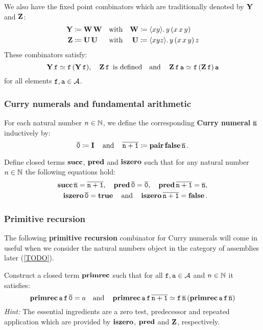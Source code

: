 We also have the fixed point combinators which are traditionally denoted by
\(\pcay\) and \(\pcaz\):
\begin{align*}
  \pcay &\coloneqq \pcaw\pcaw &\text{with}&& \pcaw &\coloneq \lambdapca{xy}{y\,(x\,x\,y)} \\
  \pcaz &\coloneqq \pcau\pcau &\text{with}&& \pcau &\coloneq \lambdapca{xyz}{y\,(x\,x\,y)\,z}
\end{align*}
These combinators satisfy:
\[
  \pcay\pca{f} \simeq \pca{f}{(\pcay\pca{f})},
    \quad
  \pcaz\pca{f} \text { is defined}
    \quad\text{and}\quad
  \pcaz\pca{f}\pca{a} \simeq \pca{f}{(\pcaz\pca{f})}\pca{a}
\]
for all elements \(\pca{f},\pca{a} \in \AA\).

\subsubsection*{Curry numerals and fundamental arithmetic}

For each natural number \(n \in \Nat\), we define the corresponding
\textbf{Curry numeral} \(\numeral{n}\) inductively by:
\[
  \numeral{0} \coloneq \icomb
  \quad\text{and}\quad
  \numeral{n+1} \coloneq \pcapair\pcafalse\numeral{n}.
\]

\begin{exercise}\label{exer:arithmetic}
  Define closed terms \(\pcasucc\), \(\pcapred\) and \(\pcaiszero\) such that
  for any natural number \(n \in \Nat\) the following equations hold:
  \begin{align*}
    \pcasucc\numeral{n} = \numeral{n+1},
    \quad
    \pcapred\numeral{0} = \numeral{0},
    \quad
    \pcapred\numeral{n+1} = \numeral{n}, \\
    \pcaiszero\numeral{0} = \pcatrue
    \quad\text{and}\quad
    \pcaiszero\numeral{n+1} = \pcafalse.
  \end{align*}

\end{exercise}

\subsubsection*{Primitive recursion}

The following \textbf{primitive recursion} combinator for Curry numerals will
come in useful when we consider the natural numbers object in the category of
assemblies later (\cref{TODO}).

\begin{exercise}\label{exer:primitive-recursion}
  Construct a closed term \(\pcarec\) such that for all
  \(\pca{f},\pca{a} \in \AA\) and \(n \in \Nat\) it satisfies:
  \[
    \pcarec\pca{a}\pca{f}\numeral{0} = a
    \quad\text{and}\quad
    \pcarec\pca{a}\pca{f}\numeral{n+1} \simeq \pca{f}\numeral{n}{(\pcarec\pca{a}\pca{f}\numeral{n})}
  \]
  \emph{Hint:} The essential ingredients are a zero test, predecessor and
  repeated application which are provided by \(\pcaiszero\), \(\pcapred\) and
  \(\pcaz\), respectively.
\end{exercise}


